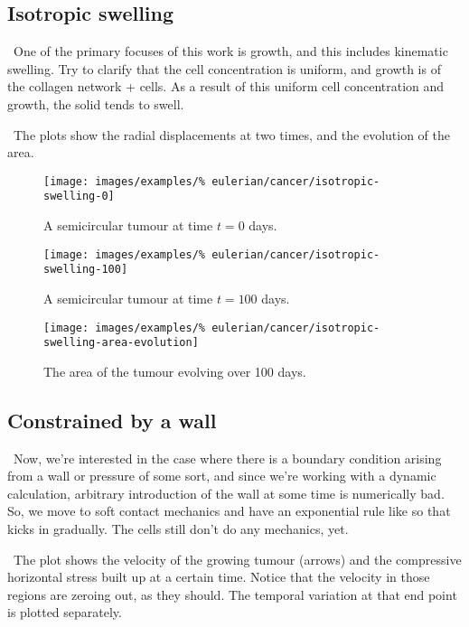 \subsection{Isotropic swelling}
\label{tumour-isotropic-swelling}

\textbullet\ One of the primary focuses of this work is growth, and this includes
kinematic swelling. Try to clarify that the cell concentration is
uniform, and growth is of the collagen network + cells. As a result of
this uniform cell concentration and growth, the solid tends to swell.

\textbullet\ The plots show the radial displacements at two times, and
the evolution of the area.

\begin{figure}[!hptb]
\centering
\texttt{[image: images/examples/\%
eulerian/cancer/isotropic-swelling-0]}
\caption{A semicircular tumour at time $t=0$ days.}
\label{tumour-isotropic-swelling-0}
\end{figure}

\begin{figure}[!hptb]
\centering
\texttt{[image: images/examples/\%
eulerian/cancer/isotropic-swelling-100]}
\caption{A semicircular tumour at time $t=100$ days.}
\label{tumour-isotropic-swelling-100}
\end{figure}

\begin{figure}[!hptb]
\centering
\texttt{[image: images/examples/\%
eulerian/cancer/isotropic-swelling-area-evolution]}
\caption{The area of the tumour evolving over 100 days.}
\label{tumour-isotropic-area-evolution}
\end{figure}

\clearpage

\subsection{Constrained by a wall}
\label{wall-constraint}

\textbullet\ Now, we're interested in the case where there is a boundary condition
arising from a wall or pressure of some sort, and since we're working
with a dynamic calculation, arbitrary introduction of the wall at some
time is numerically bad. So, we move to soft contact mechanics and
have an exponential rule like so that kicks in gradually. The cells
still don't do any mechanics, yet.

\textbullet\ The plot shows the velocity of the growing tumour
(arrows) and the compressive horizontal stress built up at a certain
time. Notice that the velocity in those regions are zeroing out, as
they should. The temporal variation at that end point is plotted separately.

